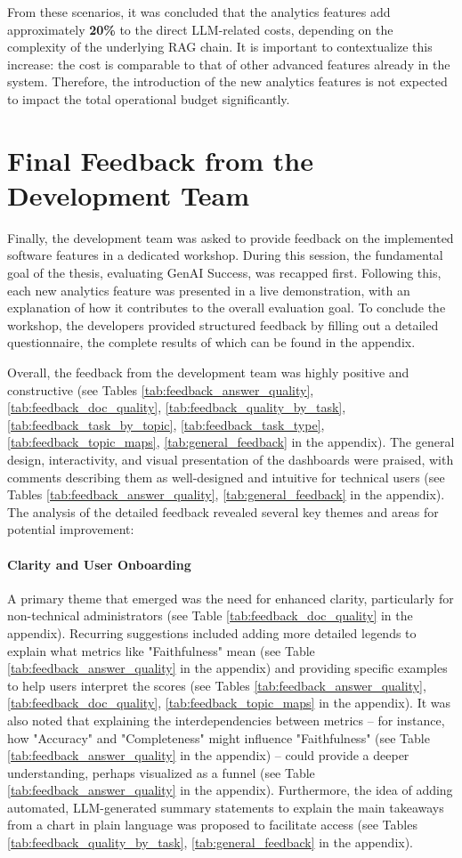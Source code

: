 \documentclass[
	english,
	ruledheaders=section,%
	class=report,%
	thesis={type=bachelor},%
	accentcolor=1b,%
	custommargins=true,%
	marginpar=false,%
	parskip=half-,%
	fontsize=11pt,%
	DIV=14,
]{tudapub}
\begin{document}
From these scenarios, it was concluded that the analytics features add approximately \textbf{20\%} to the direct LLM-related costs, depending on the complexity of the underlying RAG chain. It is important to contextualize this increase: the cost is comparable to that of other advanced features already in the system. Therefore, the introduction of the new analytics features is not expected to impact the total operational budget significantly.

\section{Final Feedback from the Development Team}
Finally, the development team was asked to provide feedback on the implemented software features in a dedicated workshop. During this session, the fundamental goal of the thesis, evaluating GenAI Success, was recapped first. Following this, each new analytics feature was presented in a live demonstration, with an explanation of how it contributes to the overall evaluation goal. To conclude the workshop, the developers provided structured feedback by filling out a detailed questionnaire, the complete results of which can be found in the appendix.

Overall, the feedback from the development team was highly positive and constructive (see Tables \ref{tab:feedback_answer_quality}, \ref{tab:feedback_doc_quality}, \ref{tab:feedback_quality_by_task}, \ref{tab:feedback_task_by_topic}, \ref{tab:feedback_task_type}, \ref{tab:feedback_topic_maps}, \ref{tab:general_feedback} in the appendix). The general design, interactivity, and visual presentation of the dashboards were praised, with comments describing them as well-designed and intuitive for technical users (see Tables \ref{tab:feedback_answer_quality}, \ref{tab:general_feedback} in the appendix). The analysis of the detailed feedback revealed several key themes and areas for potential improvement:

\paragraph{Clarity and User Onboarding} A primary theme that emerged was the need for enhanced clarity, particularly for non-technical administrators (see Table \ref{tab:feedback_doc_quality} in the appendix). Recurring suggestions included adding more detailed legends to explain what metrics like "Faithfulness" mean (see Table \ref{tab:feedback_answer_quality} in the appendix) and providing specific examples to help users interpret the scores (see Tables \ref{tab:feedback_answer_quality}, \ref{tab:feedback_doc_quality}, \ref{tab:feedback_topic_maps} in the appendix). It was also noted that explaining the interdependencies between metrics -- for instance, how "Accuracy" and "Completeness" might influence "Faithfulness" (see Table \ref{tab:feedback_answer_quality} in the appendix) -- could provide a deeper understanding, perhaps visualized as a funnel (see Table \ref{tab:feedback_answer_quality} in the appendix). Furthermore, the idea of adding automated, LLM-generated summary statements to explain the main takeaways from a chart in plain language was proposed to facilitate access (see Tables \ref{tab:feedback_quality_by_task}, \ref{tab:general_feedback} in the appendix).
\end{document}
